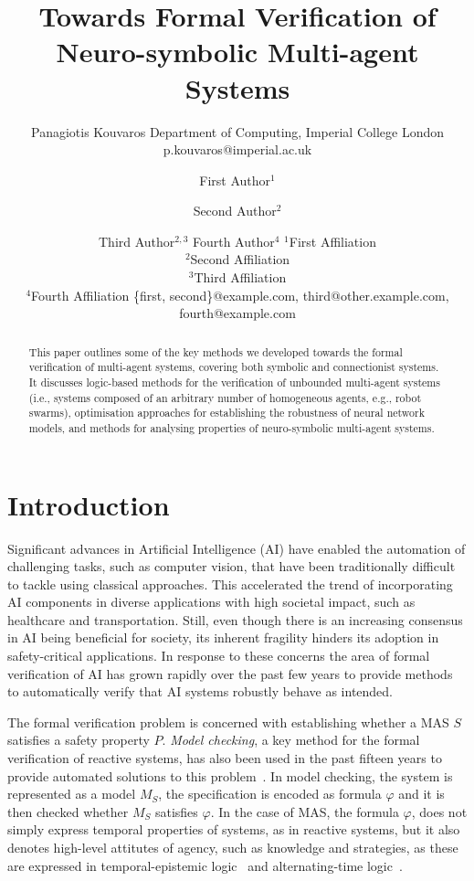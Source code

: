 \documentclass{article}
\title{Towards Formal Verification of Neuro-symbolic Multi-agent Systems}
\author{
    Panagiotis Kouvaros
    \affiliations
    Department of Computing, Imperial College London
    \emails
    p.kouvaros@imperial.ac.uk
}
\author{
First Author$^1$
\and
Second Author$^2$\and
Third Author$^{2,3}$\And
Fourth Author$^4$
\affiliations
$^1$First Affiliation\\
$^2$Second Affiliation\\
$^3$Third Affiliation\\
$^4$Fourth Affiliation
\emails
\{first, second\}@example.com,
third@other.example.com,
fourth@example.com
}
\begin{document}
\maketitle

\begin{abstract}

This paper outlines some of the key methods we developed towards the formal
verification of multi-agent systems, covering both symbolic and connectionist
systems.  It discusses logic-based methods for the verification of unbounded
multi-agent systems (i.e., systems composed of an arbitrary number of
homogeneous agents, e.g., robot swarms), optimisation approaches for
establishing the robustness of neural network models, and methods for analysing
properties of neuro-symbolic multi-agent systems.

\end{abstract}

\section{Introduction}

Significant advances in Artificial Intelligence (AI) have enabled the
automation of challenging tasks, such as computer vision, that have been
traditionally difficult to tackle using classical approaches.  This accelerated
the trend of incorporating AI components in diverse applications with high
societal impact, such as healthcare and transportation. Still, even though
there is an increasing consensus in AI being beneficial for society,  its
inherent fragility hinders its adoption in safety-critical applications.  In
response to these concerns the area of formal verification of AI has grown
rapidly over the past few years to provide methods to automatically verify that
AI systems robustly behave as intended.

The formal verification problem is concerned with establishing whether a MAS
$S$ satisfies a safety property $P$. {\em Model checking}, a key method for the
formal verification of reactive systems, has also been used in the past fifteen
years to provide automated solutions to this problem~\cite{Clarke+99a}. In
model checking, the system is represented as a model $M_S$, the specification
is encoded as formula $\varphi$ and it is then checked whether $M_S$ satisfies
$\varphi$. In the case of MAS, the formula $\varphi$, does not simply express
temporal properties of systems, as in reactive systems, but it also denotes
high-level attitutes of agency, such as knowledge and strategies, as these are
expressed in temporal-epistemic logic~\cite{Fagin+95b} and alternating-time
logic~\cite{Alur+98a}.
\end{document}
